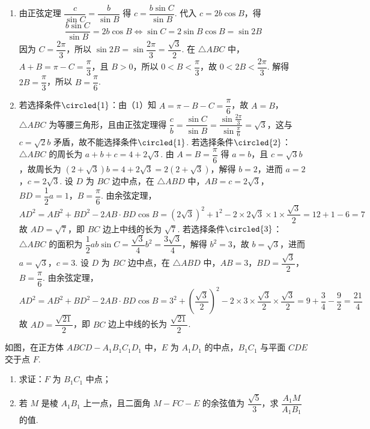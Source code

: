 \begin{solution}
\begin{enumerate}
    \item 由正弦定理 \(\dfrac{c}{\sin C}=\dfrac{b}{\sin B}\) 得 \(c=\dfrac{b\sin C}{\sin B}\). 代入 \(c=2b\cos B\)，得
\[
\frac{b\sin C}{\sin B}=2b\cos B\Longleftrightarrow\sin C=2\sin B\cos B=\sin 2B
\]
因为 \(C=\dfrac{2\pi}{3}\)，所以 \(\sin 2B=\sin\dfrac{2\pi}{3}=\dfrac{\sqrt3}{2}\).
在 \(\triangle ABC\) 中，\(A+B=\pi-C=\dfrac{\pi}{3}\)，且 \(B>0\)，所以 \(0<B<\dfrac{\pi}{3}\)，故 \(0<2B<\dfrac{2\pi}{3}\).
解得 \(2B=\dfrac{\pi}{3}\)，所以 \(B=\dfrac{\pi}{6}\).
    \item 若选择条件\(\circled{1}\)：由（1）知 \(A=\pi-B-C=\dfrac{\pi}{6}\)，故 \(A=B\)，\(\triangle ABC\) 为等腰三角形，且由正弦定理得 \(\dfrac{c}{b}=\dfrac{\sin C}{\sin B}=\dfrac{\sin\frac{2\pi}{3}}{\sin\frac{\pi}{6}}=\sqrt3\)，这与 \(c=\sqrt2b\) 矛盾，故不能选择条件\(\circled{1}\).
若选择条件\(\circled{2}\)：\(\triangle ABC\) 的周长为 \(a+b+c=4+2\sqrt3\). 由 \(A=B=\dfrac{\pi}{6}\) 得 \(a=b\)，且 \(c=\sqrt3 b\)，故周长为 \((2+\sqrt3)b=4+2\sqrt3=2(2+\sqrt3)\)，解得 \(b=2\)，进而 \(a=2\)，\(c=2\sqrt3\).
设 \(D\) 为 \(BC\) 边中点，在 \(\triangle ABD\) 中，\(AB=c=2\sqrt3\)，\(BD=\dfrac12 a=1\)，\(B=\dfrac{\pi}{6}\). 由余弦定理，
\[
AD^2=AB^2+BD^2-2AB\cdot BD\cos B=(2\sqrt3)^2+1^2-2\times2\sqrt3\times1\times\frac{\sqrt3}{2}=12+1-6=7
\]
故 \(AD=\sqrt7\)，即 \(BC\) 边上中线的长为 \(\sqrt7\).
若选择条件\(\circled{3}\)：\(\triangle ABC\) 的面积为 \(\dfrac12 ab\sin C=\dfrac{\sqrt3}{4}b^2=\dfrac{3\sqrt3}{4}\)，解得 \(b^2=3\)，故 \(b=\sqrt3\)，进而 \(a=\sqrt3\)，\(c=3\).
设 \(D\) 为 \(BC\) 边中点，在 \(\triangle ABD\) 中，\(AB=3\)，\(BD=\dfrac{\sqrt3}{2}\)，\(B=\dfrac{\pi}{6}\). 由余弦定理，
\[
AD^2=AB^2+BD^2-2AB\cdot BD\cos B=3^2+\left(\frac{\sqrt3}{2}\right)^2-2\times3\times\frac{\sqrt3}{2}\times\frac{\sqrt3}{2}=9+\frac34-\frac92=\frac{21}{4}
\]
故 \(AD=\dfrac{\sqrt{21}}{2}\)，即 \(BC\) 边上中线的长为 \(\dfrac{\sqrt{21}}{2}\).
\end{enumerate}
\end{solution}

\begin{problem}
如图，在正方体 \(ABCD-A_1B_1C_1D_1\) 中，\(E\) 为 \(A_1D_1\) 的中点，\(B_1C_1\) 与平面 \(CDE\) 交于点 \(F\).

\begin{enumerate}
    \item 求证：\(F\) 为 \(B_1C_1\) 中点；
    \item 若 \(M\) 是棱 \(A_1B_1\) 上一点，且二面角 \(M-FC-E\) 的余弦值为 \(\dfrac{\sqrt5}{3}\)，求 \(\dfrac{A_1M}{A_1B_1}\) 的值.
\end{enumerate}

\end{problem}

